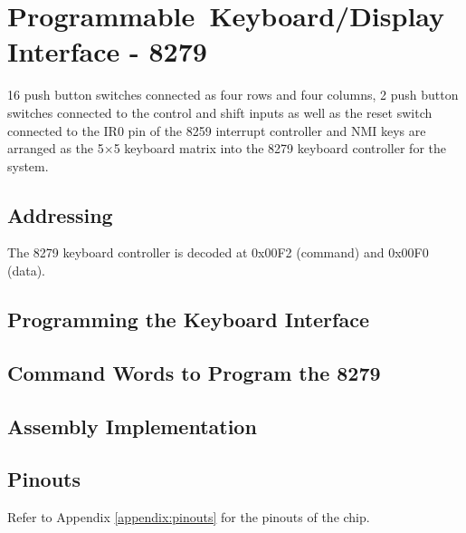 \section{Programmable Keyboard/Display Interface - 8279}
16 push button switches connected as four rows and four columns, 2 push button switches connected to the control and shift inputs as well as the reset switch connected to the IR0 pin of the 8259 interrupt controller and NMI keys are arranged as the 5$\times$5 keyboard matrix into the 8279 keyboard controller for the system.

    \subsection{Addressing}
    The 8279 keyboard controller is decoded at 0x00F2 (command) and 0x00F0 (data).

    \subsection{Programming the Keyboard Interface}

    \subsection{Command Words to Program the 8279}

    \subsection{Assembly Implementation}

    \subsection{Pinouts}
    Refer to Appendix \ref{appendix:pinouts} for the pinouts of the chip.
